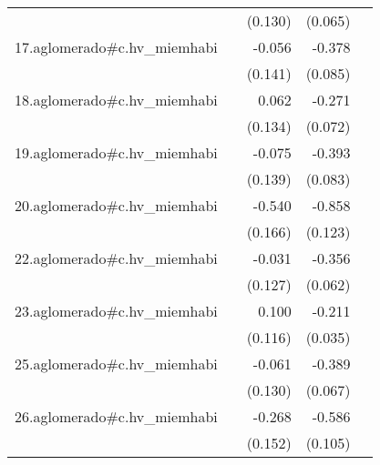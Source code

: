 {\begin{longtable}{l*{4}{D{.}{.}{-1}}}
            &                     &     (0.130)         &     (0.065)         &                     \\
\addlinespace
17.aglomerado#c.hv\_miemhabi&                     &      -0.056         &      -0.378\sym{***}&                     \\
            &                     &     (0.141)         &     (0.085)         &                     \\
\addlinespace
18.aglomerado#c.hv\_miemhabi&                     &       0.062         &      -0.271\sym{***}&                     \\
            &                     &     (0.134)         &     (0.072)         &                     \\
\addlinespace
19.aglomerado#c.hv\_miemhabi&                     &      -0.075         &      -0.393\sym{***}&                     \\
            &                     &     (0.139)         &     (0.083)         &                     \\
\addlinespace
20.aglomerado#c.hv\_miemhabi&                     &      -0.540\sym{**} &      -0.858\sym{***}&                     \\
            &                     &     (0.166)         &     (0.123)         &                     \\
\addlinespace
22.aglomerado#c.hv\_miemhabi&                     &      -0.031         &      -0.356\sym{***}&                     \\
            &                     &     (0.127)         &     (0.062)         &                     \\
\addlinespace
23.aglomerado#c.hv\_miemhabi&                     &       0.100         &      -0.211\sym{***}&                     \\
            &                     &     (0.116)         &     (0.035)         &                     \\
\addlinespace
25.aglomerado#c.hv\_miemhabi&                     &      -0.061         &      -0.389\sym{***}&                     \\
            &                     &     (0.130)         &     (0.067)         &                     \\
\addlinespace
26.aglomerado#c.hv\_miemhabi&                     &      -0.268         &      -0.586\sym{***}&                     \\
            &                     &     (0.152)         &     (0.105)         &                     \\

\end{longtable}}
